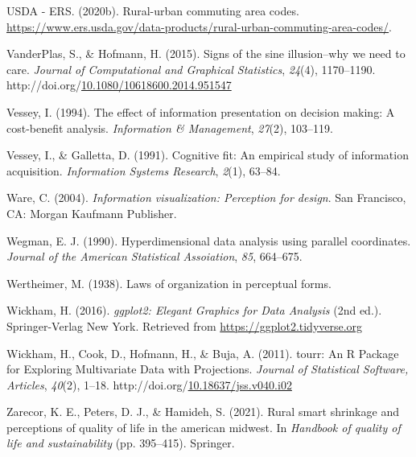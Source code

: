 \documentclass[print]{nuthesis}
\newlength{\cslhangindent}
\newenvironment{CSLReferences}[2]%
{\setlength{\parindent}{0pt}%
\everypar{\setlength{\hangindent}{\cslhangindent}}\ignorespaces}%
{\par}
\begin{document}
\begin{CSLReferences}{1}{0}
\leavevmode\hypertarget{ref-usda}{}%
USDA - ERS. (2020b). Rural-urban commuting area codes. \url{https://www.ers.usda.gov/data-products/rural-urban-commuting-area-codes/}.

\leavevmode\hypertarget{ref-sineillusion}{}%
VanderPlas, S., \& Hofmann, H. (2015). Signs of the sine illusion--why we need to care. \emph{Journal of Computational and Graphical Statistics}, \emph{24}(4), 1170--1190. http://doi.org/\href{https://doi.org/10.1080/10618600.2014.951547}{10.1080/10618600.2014.951547}

\leavevmode\hypertarget{ref-vessey1994}{}%
Vessey, I. (1994). The effect of information presentation on decision making: A cost-benefit analysis. \emph{Information \& Management}, \emph{27}(2), 103--119.

\leavevmode\hypertarget{ref-vessey1991}{}%
Vessey, I., \& Galletta, D. (1991). Cognitive fit: An empirical study of information acquisition. \emph{Information Systems Research}, \emph{2}(1), 63--84.

\leavevmode\hypertarget{ref-Ware2004}{}%
Ware, C. (2004). \emph{Information visualization: Perception for design}. San Francisco, CA: Morgan Kaufmann Publisher.

\leavevmode\hypertarget{ref-Wegman}{}%
Wegman, E. J. (1990). {Hyperdimensional data analysis using parallel coordinates}. \emph{Journal of the American Statistical Assoiation}, \emph{85}, 664--675.

\leavevmode\hypertarget{ref-wertheimer1938}{}%
Wertheimer, M. (1938). Laws of organization in perceptual forms.

\leavevmode\hypertarget{ref-ggplot2}{}%
Wickham, H. (2016). \emph{{ggplot2: Elegant Graphics for Data Analysis}} (2nd ed.). Springer-Verlag New York. Retrieved from \url{https://ggplot2.tidyverse.org}

\leavevmode\hypertarget{ref-tourr}{}%
Wickham, H., Cook, D., Hofmann, H., \& Buja, A. (2011). {tourr: An R Package for Exploring Multivariate Data with Projections}. \emph{Journal of Statistical Software, Articles}, \emph{40}(2), 1--18. http://doi.org/\href{https://doi.org/10.18637/jss.v040.i02}{10.18637/jss.v040.i02}

\leavevmode\hypertarget{ref-zarecor2021rural}{}%
Zarecor, K. E., Peters, D. J., \& Hamideh, S. (2021). Rural smart shrinkage and perceptions of quality of life in the american midwest. In \emph{Handbook of quality of life and sustainability} (pp. 395--415). Springer.

\end{CSLReferences}
\end{document}

